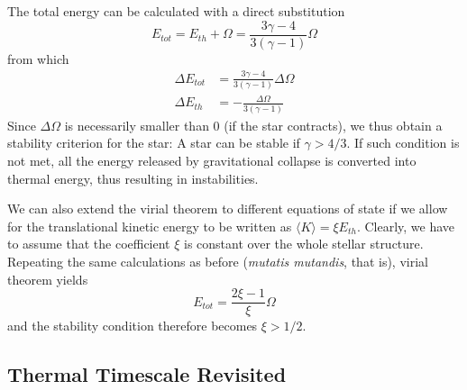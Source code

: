 \par The total energy can be calculated with a direct substitution
\begin{equation*}
	E_{tot} = E_{th}+\Omega = \frac{3\gamma -4}{3(\gamma -1)}\Omega
\end{equation*}
from which
\begin{align*}
	\Delta E_{tot} &= \frac{3\gamma -4}{3(\gamma -1)}\Delta\Omega\\
	\Delta E_{th} &= -\frac{\Delta\Omega}{3(\gamma -1)}
\end{align*}
Since $\Delta\Omega$ is necessarily smaller than 0 (if the star contracts), we thus obtain a stability criterion for the star: A star can be stable if $\gamma > 4/3$. If such condition is not met, all the energy released by gravitational collapse is converted into thermal energy, thus resulting in instabilities.
\par We can also extend the virial theorem to different equations of state if we allow for the translational kinetic energy to be written as $\langle K \rangle = \xi E_{th}$. Clearly, we have to assume that the coefficient $\xi$ is constant over the whole stellar structure. Repeating the same calculations as before (\emph{mutatis mutandis}, that is), virial theorem yields
\begin{equation*}
	E_{tot} = \frac{2\xi - 1}{\xi}\Omega
\end{equation*}
and the stability condition therefore becomes $\xi > 1/2$.

\subsection{Thermal Timescale Revisited}

